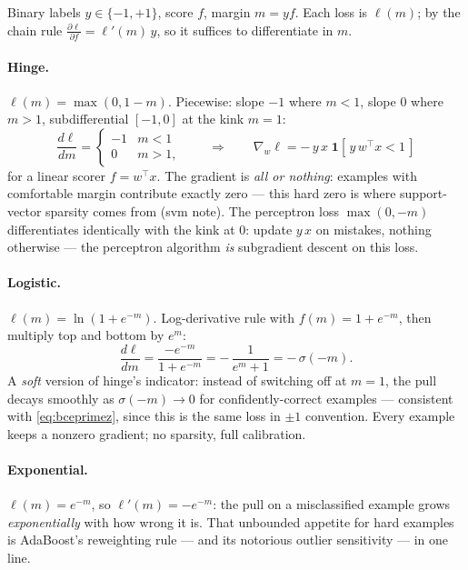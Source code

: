 \documentclass[11pt]{article}
\begin{document}
Binary labels $y \in \{-1, +1\}$, score $f$, margin $m = y f$. Each
loss is $\ell(m)$; by the chain rule
$\frac{\partial \ell}{\partial f} = \ell'(m)\, y$, so it suffices to
differentiate in $m$.

\paragraph{Hinge.} $\ell(m) = \max(0, 1 - m)$. Piecewise: slope $-1$
where $m < 1$, slope $0$ where $m > 1$, subdifferential $[-1, 0]$ at
the kink $m = 1$:
\begin{equation}
  \frac{d\ell}{dm} =
  \begin{cases}
    -1 & m < 1\\
    0 & m > 1,
  \end{cases}
  \qquad\Longrightarrow\qquad
  \nabla_w \ell = -\,y\,x\;\mathbf{1}[\,y\,w^{\top}x < 1\,]
  \label{eq:hingeprime}
\end{equation}
for a linear scorer $f = w^{\top}x$. The gradient is \emph{all or
nothing}: examples with comfortable margin contribute exactly zero ---
this hard zero is where support-vector sparsity comes from (svm note).
The perceptron loss $\max(0, -m)$ differentiates identically with the
kink at $0$: update $y\,x$ on mistakes, nothing otherwise --- the
perceptron algorithm \emph{is} subgradient descent on this loss.

\paragraph{Logistic.} $\ell(m) = \ln(1 + e^{-m})$. Log-derivative rule
with $f(m) = 1 + e^{-m}$, then multiply top and bottom by $e^{m}$:
\begin{equation}
  \frac{d\ell}{dm}
  = \frac{-e^{-m}}{1 + e^{-m}}
  = -\,\frac{1}{e^{m} + 1}
  = -\,\sigma(-m).
  \label{eq:logisticprime}
\end{equation}
A \emph{soft} version of hinge's indicator: instead of switching off at
$m = 1$, the pull decays smoothly as $\sigma(-m) \to 0$ for
confidently-correct examples --- consistent with
\eqref{eq:bceprimez}, since this is the same loss in $\pm 1$
convention. Every example keeps a nonzero gradient; no sparsity, full
calibration.

\paragraph{Exponential.} $\ell(m) = e^{-m}$, so
$\ell'(m) = -e^{-m}$: the pull on a misclassified example grows
\emph{exponentially} with how wrong it is. That unbounded appetite for
hard examples is AdaBoost's reweighting rule --- and its notorious
outlier sensitivity --- in one line.
\end{document}
